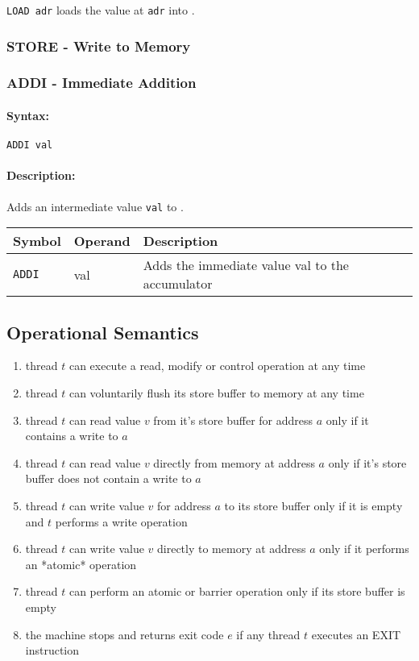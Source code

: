 \texttt{LOAD adr} loads the value at \texttt{adr} into \accu.

\subsubsection{STORE - Write to Memory}
\subsubsection{ADDI - Immediate Addition}

\paragraph{Syntax:} \texttt{ADDI val}
\paragraph{Description:} Adds an intermediate value \texttt{val} to \accu.

\begin{tabular}{|l|l|l|}
  \hline
  \textbf{Symbol} & \textbf{Operand} & \textbf{Description} \\
  \hline
  \texttt{ADDI} & val & Adds the immediate value val to the accumulator \\
  \hline
\end{tabular}

\subsection{Operational Semantics}

\begin{enumerate}
  \item thread $t$ can execute a read, modify or control operation at any time
  \item thread $t$ can voluntarily flush its store buffer to memory at any time
  \item thread $t$ can read value $v$ from it's store buffer for address $a$ only if it contains a write to $a$
  \item thread $t$ can read value $v$ directly from memory at address $a$ only if it's store buffer does not contain a write to $a$
  \item thread $t$ can write value $v$ for address $a$ to its store buffer only if it is empty and $t$ performs a write operation
  \item thread $t$ can write value $v$ directly to memory at address $a$ only if it performs an *atomic* operation
  \item thread $t$ can perform an atomic or barrier operation only if its store buffer is empty
  \item the machine stops and returns exit code $e$ if any thread $t$ executes an EXIT instruction
\end{enumerate}

